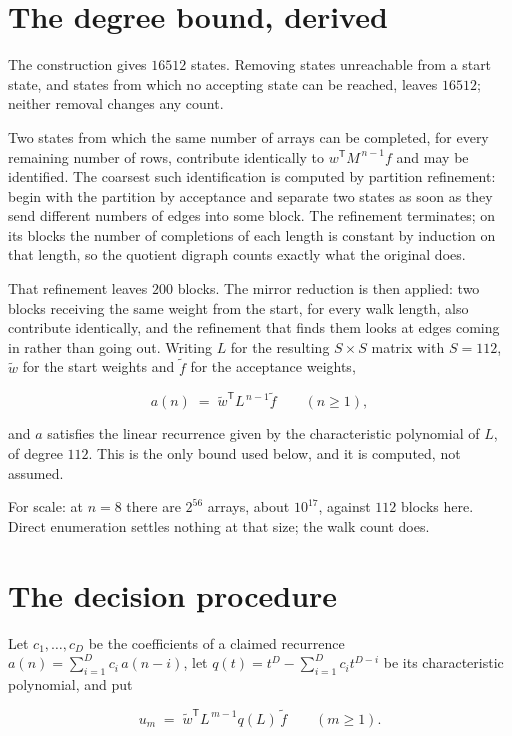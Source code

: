 \documentclass[11pt]{article}
\theoremstyle{definition}
\begin{document}
\section{The degree bound, derived}

The construction gives $16512$ states. Removing states unreachable from a start state, and states from which no accepting state can be reached, leaves $16512$; neither removal changes any count.

Two states from which the same number of arrays can be completed, for every remaining number of rows, contribute identically to $w^{\mathsf T}M^{\,n-1}f$ and may be identified. The coarsest such identification is computed by partition refinement: begin with the partition by acceptance and separate two states as soon as they send different numbers of edges into some block. The refinement terminates; on its blocks the number of completions of each length is constant by induction on that length, so the quotient digraph counts exactly what the original does.

That refinement leaves $200$ blocks. The mirror reduction is then applied: two blocks receiving the same weight from the start, for every walk length, also contribute identically, and the refinement that finds them looks at edges coming in rather than going out. Writing $L$ for the resulting $S \times S$ matrix with $S = 112$, $\tilde w$ for the start weights and $\tilde f$ for the acceptance weights,

\[a(n) \;=\; \tilde w^{\mathsf T} L^{\,n-1} \tilde f \qquad (n \ge 1),\]

and $a$ satisfies the linear recurrence given by the characteristic polynomial of $L$, of degree $112$. This is the only bound used below, and it is computed, not assumed.

For scale: at $n = 8$ there are $2^{56}$ arrays, about $10^{17}$, against $112$ blocks here. Direct enumeration settles nothing at that size; the walk count does.

\section{The decision procedure}

Let $c_1,\dots,c_D$ be the coefficients of a claimed recurrence $a(n) = \sum_{i=1}^{D} c_i\,a(n-i)$, let $q(t) = t^{D} - \sum_{i=1}^{D} c_i t^{D-i}$ be its characteristic polynomial, and put

\[u_m \;=\; \tilde w^{\mathsf T} L^{\,m-1} q(L)\,\tilde f \qquad (m \ge 1).\]
\end{document}
